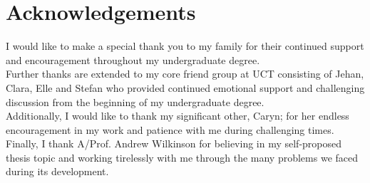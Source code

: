 \section*{Acknowledgements}
I would like to make a special thank you to my family for their continued support and encouragement throughout my undergraduate degree.\\
Further thanks are extended to my core friend group at UCT consisting of Jehan, Clara, Elle and Stefan who provided continued emotional support and challenging discussion from the beginning of my undergraduate degree.\\
Additionally, I would like to thank my significant other, Caryn; for her endless encouragement in my work and patience with me during challenging times.\\
Finally, I thank A/Prof. Andrew Wilkinson for believing in my self-proposed thesis topic and working tirelessly with me through the many problems we faced during its development.
\newpage